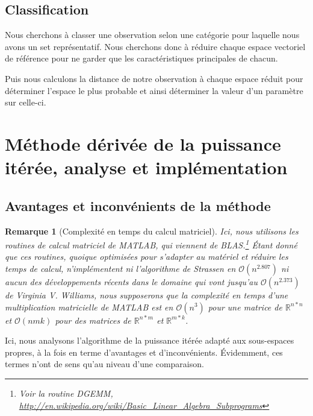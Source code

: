 \documentclass[a4paper,12pt]{article}
\newtheorem*{remark}{Remarque}
\begin{document}
    \subsection{Classification}

        Nous cherchons à classer une observation selon une catégorie pour
        laquelle nous avons un set représentatif. Nous cherchons donc à réduire
        chaque espace vectoriel de référence pour ne garder que les
        caractéristiques principales de chacun.

        Puis nous calculons la distance de notre observation à chaque espace
        réduit pour déterminer l'espace le plus probable et ainsi déterminer la
        valeur d'un paramètre sur celle-ci.


\section{Méthode dérivée de la puissance itérée, analyse et implémentation}

    \subsection{Avantages et inconvénients de la méthode}

        \begin{remark}[Complexité en temps du calcul matriciel]
        Ici, nous utilisons les routines de calcul matriciel de MATLAB, qui
        viennent de BLAS.\footnote{Voir la routine DGEMM,
        \url{http://en.wikipedia.org/wiki/Basic_Linear_Algebra_Subprograms}}
        Étant donné que ces routines, quoique optimisées pour s'adapter au
        matériel et réduire les temps de calcul, n'implémentent ni l'algorithme
        de Strassen en $\mathcal{O}(n^{2.807})$ ni aucun des développements
        récents dans le domaine qui vont jusqu'au $\mathcal{O}(n^{2.373})$ de
        Virginia V. Williams, nous supposerons que la complexité en temps d'une
        multiplication matricielle de MATLAB est en $\mathcal{O}(n^3)$ pour une
        matrice de $\mathbb{R}^{n*n}$ et $\mathcal{O}(nmk)$ pour des matrices de
        $\mathbb{R}^{n*m}$ et $\mathbb{R}^{m*k}$.
        \end{remark}

        Ici, nous analysons l'algorithme de la puissance itérée adapté aux
        sous-espaces propres, à la fois en terme d'avantages et d'inconvénients.
        Évidemment, ces termes n'ont de sens qu'au niveau d'une comparaison.
\end{document}

